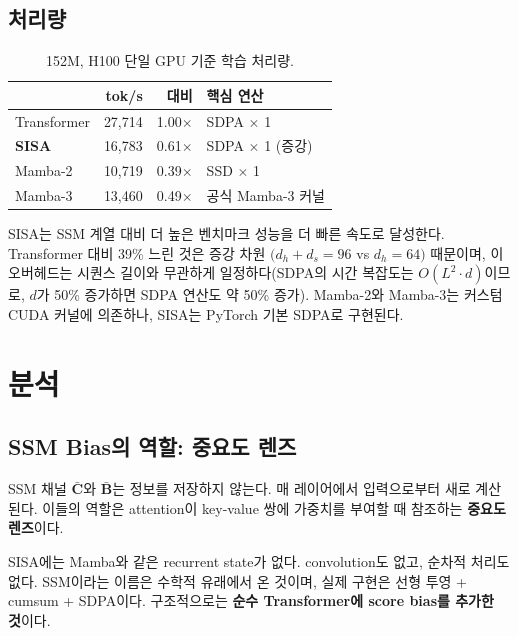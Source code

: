 \documentclass[11pt]{article}
\begin{document}
\subsection{처리량}

\begin{table}[h]
\centering
\caption{152M, H100 단일 GPU 기준 학습 처리량.}
\label{tab:throughput}
\begin{tabular}{lrrl}
\toprule
& \textbf{tok/s} & \textbf{대비} & \textbf{핵심 연산} \\
\midrule
Transformer & 27,714 & 1.00$\times$ & SDPA $\times$ 1 \\
\textbf{SISA} & 16,783 & 0.61$\times$ & SDPA $\times$ 1 (증강) \\
Mamba-2 & 10,719 & 0.39$\times$ & SSD $\times$ 1 \\
Mamba-3 & 13,460 & 0.49$\times$ & 공식 Mamba-3 커널 \\
\bottomrule
\end{tabular}
\end{table}

SISA는 SSM 계열 대비 더 높은 벤치마크 성능을 더 빠른 속도로 달성한다. Transformer 대비 39\% 느린 것은 증강 차원 $(d_h{+}d_s=96$ vs $d_h{=}64)$ 때문이며, 이 오버헤드는 시퀀스 길이와 무관하게 일정하다(SDPA의 시간 복잡도는 $O(L^2 \cdot d)$이므로, $d$가 50\% 증가하면 SDPA 연산도 약 50\% 증가). Mamba-2와 Mamba-3는 커스텀 CUDA 커널에 의존하나, SISA는 PyTorch 기본 SDPA로 구현된다.

\section{분석}

\subsection{SSM Bias의 역할: 중요도 렌즈}

SSM 채널 $\bar{\mathbf{C}}$와 $\bar{\mathbf{B}}$는 정보를 저장하지 않는다. 매 레이어에서 입력으로부터 새로 계산된다. 이들의 역할은 attention이 key-value 쌍에 가중치를 부여할 때 참조하는 \textbf{중요도 렌즈}이다.

SISA에는 Mamba와 같은 recurrent state가 없다. convolution도 없고, 순차적 처리도 없다. SSM이라는 이름은 수학적 유래에서 온 것이며, 실제 구현은 선형 투영 + cumsum + SDPA이다. 구조적으로는 \textbf{순수 Transformer에 score bias를 추가한 것}이다.
\end{document}

